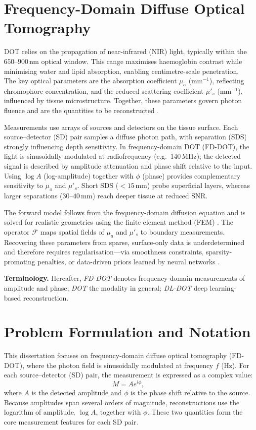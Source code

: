 \section{Frequency-Domain Diffuse Optical Tomography}
DOT relies on the propagation of near-infrared (NIR) light, typically within the $650$–$900$\,nm optical window. This range maximises haemoglobin contrast while minimising water and lipid absorption, enabling centimetre-scale penetration. The key optical parameters are the absorption coefficient $\mu_a$ (mm$^{-1}$), reflecting chromophore concentration, and the reduced scattering coefficient $\mu'_s$ (mm$^{-1}$), influenced by tissue microstructure. Together, these parameters govern photon fluence and are the quantities to be reconstructed \cite{arridge1999, gibson2005}.

Measurements use arrays of sources and detectors on the tissue surface. Each source–detector (SD) pair samples a diffuse photon path, with separation (SDS) strongly influencing depth sensitivity. In frequency-domain DOT (FD-DOT), the light is sinusoidally modulated at radiofrequency (e.g.\ 140\,MHz); the detected signal is described by amplitude attenuation and phase shift relative to the input. Using $\log A$ (log-amplitude) together with $\phi$ (phase) provides complementary sensitivity to $\mu_a$ and $\mu'_s$. Short SDS ($<15$\,mm) probe superficial layers, whereas larger separations ($30$–$40$\,mm) reach deeper tissue at reduced SNR.

The forward model follows from the frequency-domain diffusion equation and is solved for realistic geometries using the finite element method (FEM) \cite{dehghani2009}. The operator $\mathcal{F}$ maps spatial fields of $\mu_a$ and $\mu'_s$ to boundary measurements. Recovering these parameters from sparse, surface-only data is underdetermined and therefore requires regularisation—via smoothness constraints, sparsity-promoting penalties, or data-driven priors learned by neural networks \cite{arridge1999}.

\textbf{Terminology.} Hereafter, \emph{FD-DOT} denotes frequency-domain measurements of amplitude and phase; \emph{DOT} the modality in general; \emph{DL-DOT} deep learning-based reconstruction.

\section{Problem Formulation and Notation}
This dissertation focuses on frequency-domain diffuse optical tomography (FD-DOT), where the photon field is sinusoidally modulated at frequency $f$ (Hz). For each source–detector (SD) pair, the measurement is expressed as a complex value:
\[
M = A e^{i\phi},
\]
where $A$ is the detected amplitude and $\phi$ is the phase shift relative to the source. Because amplitudes span several orders of magnitude, reconstructions use the logarithm of amplitude, $\log A$, together with $\phi$. These two quantities form the core measurement features for each SD pair.

